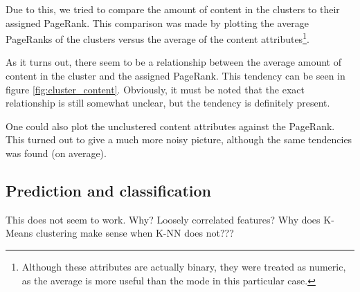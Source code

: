 Due to this, we tried to compare the amount of content in the clusters to their assigned PageRank. This comparison was made by plotting the average PageRanks of the clusters versus the average of the content attributes\footnote{Although these attributes are actually binary, they were treated as numeric, as the average is more useful than the mode in this particular case.}. 

As it turns out, there seem to be a relationship between the average amount of content in the cluster and the assigned PageRank. This tendency can be seen in figure \ref{fig:cluster_content}. Obviously, it must be noted that the exact relationship is still somewhat unclear, but the tendency is definitely present.


One could also plot the unclustered content attributes against the PageRank. This turned out to give a much more noisy picture, although the same tendencies was found (on average).

\subsection{Prediction and classification}
\label{subsec:predictclassify}

This does not seem to work. Why? Loosely correlated features? Why does K-Means clustering make sense when K-NN does not???